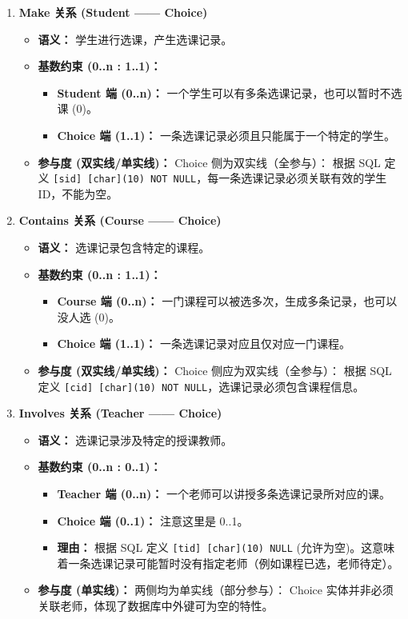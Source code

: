 \documentclass[a4paper]{article}
\begin{document}
\begin{enumerate}
    \item \textbf{Make 关系 (Student —— Choice)}
    \begin{itemize}
        \item \textbf{语义：} 学生进行选课，产生选课记录。
        \item \textbf{基数约束 (0..n : 1..1)：}
        \begin{itemize}
            \item \textbf{Student 端 (0..n)：} 一个学生可以有多条选课记录，也可以暂时不选课 (0)。
            \item \textbf{Choice 端 (1..1)：} 一条选课记录必须且只能属于一个特定的学生。
        \end{itemize}
        \item \textbf{参与度 (双实线/单实线)：} Choice 侧为双实线（全参与）： 根据 SQL 定义 \texttt{[sid] [char](10) NOT NULL}，每一条选课记录必须关联有效的学生 ID，不能为空。
    \end{itemize}

    \item \textbf{Contains 关系 (Course —— Choice)}
    \begin{itemize}
        \item \textbf{语义：} 选课记录包含特定的课程。
        \item \textbf{基数约束 (0..n : 1..1)：}
        \begin{itemize}
            \item \textbf{Course 端 (0..n)：} 一门课程可以被选多次，生成多条记录，也可以没人选 (0)。
            \item \textbf{Choice 端 (1..1)：} 一条选课记录对应且仅对应一门课程。
        \end{itemize}
        \item \textbf{参与度 (双实线/单实线)：} Choice 侧应为双实线（全参与）： 根据 SQL 定义 \texttt{[cid] [char](10) NOT NULL}，选课记录必须包含课程信息。
    \end{itemize}

    \item \textbf{Involves 关系 (Teacher —— Choice)}
    \begin{itemize}
        \item \textbf{语义：} 选课记录涉及特定的授课教师。
        \item \textbf{基数约束 (0..n : 0..1)：}
        \begin{itemize}
            \item \textbf{Teacher 端 (0..n)：} 一个老师可以讲授多条选课记录所对应的课。
            \item \textbf{Choice 端 (0..1)：} 注意这里是 0..1。
            \item \textbf{理由：} 根据 SQL 定义 \texttt{[tid] [char](10) NULL} (允许为空)。这意味着一条选课记录可能暂时没有指定老师（例如课程已选，老师待定）。
        \end{itemize}
        \item \textbf{参与度 (单实线)：} 两侧均为单实线（部分参与）： Choice 实体并非必须关联老师，体现了数据库中外键可为空的特性。
    \end{itemize}
\end{enumerate}
\end{document}
